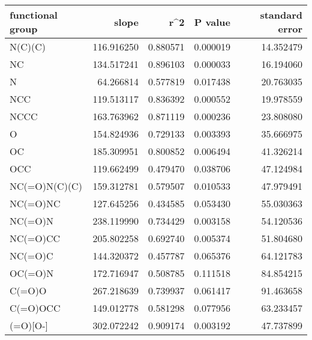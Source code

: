 \begin{tabular}{lrrrr}
\toprule
functional group &       slope &       r\textasciicircum 2 &   P value &  standard error \\
\midrule
         N(C)(C) &  116.916250 &  0.880571 &  0.000019 &       14.352479 \\
              NC &  134.517241 &  0.896103 &  0.000033 &       16.194060 \\
               N &   64.266814 &  0.577819 &  0.017438 &       20.763035 \\
             NCC &  119.513117 &  0.836392 &  0.000552 &       19.978559 \\
            NCCC &  163.763962 &  0.871119 &  0.000236 &       23.808080 \\
               O &  154.824936 &  0.729133 &  0.003393 &       35.666975 \\
              OC &  185.309951 &  0.800852 &  0.006494 &       41.326214 \\
             OCC &  119.662499 &  0.479470 &  0.038706 &       47.124984 \\
   NC(=O)N(C)(C) &  159.312781 &  0.579507 &  0.010533 &       47.979491 \\
        NC(=O)NC &  127.645256 &  0.434585 &  0.053430 &       55.030363 \\
         NC(=O)N &  238.119990 &  0.734429 &  0.003158 &       54.120536 \\
        NC(=O)CC &  205.802258 &  0.692740 &  0.005374 &       51.804680 \\
         NC(=O)C &  144.320372 &  0.457787 &  0.065376 &       64.121783 \\
         OC(=O)N &  172.716947 &  0.508785 &  0.111518 &       84.854215 \\
          C(=O)O &  267.218639 &  0.739937 &  0.061417 &       91.463658 \\
        C(=O)OCC &  149.012778 &  0.581298 &  0.077956 &       63.233457 \\
    [N+](=O)[O-] &  302.072242 &  0.909174 &  0.003192 &       47.737899 \\
\bottomrule
\end{tabular}
